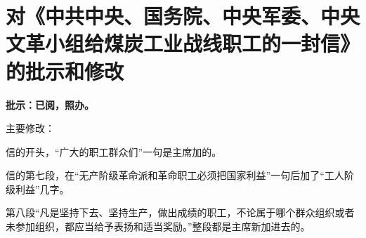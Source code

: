 \section[对《中共中央、国务院、中央军委、中央文革小组给煤炭工业战线职工的一封信》的批示和修改（一九六七年八月十六日）]{对《中共中央、国务院、中央军委、中央文革小组给煤炭工业战线职工的一封信》的批示和修改}


\textbf{批示：已阅，照办。}


主要修改：

信的开头，“广大的职工群众们”一句是主席加的。

信的第七段，在“无产阶级革命派和革命职工必须把国家利益”一句后加了“工人阶级利益”几字。

第八段“凡是坚持下去、坚持生产，做出成绩的职工，不论属于哪个群众组织或者未参加组织，都应当给予表扬和适当奖励。”整段都是主席新加进去的。

